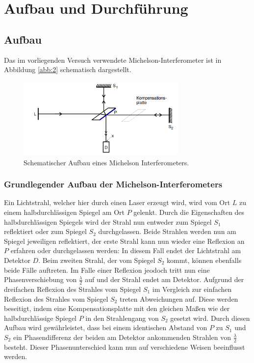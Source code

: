 \section{Aufbau und Durchführung}
\subsection{Aufbau}
\label{sec:Aufbau}

Das im vorliegenden Versuch verwendete Michelson-Interferometer ist in Abbildung \ref{abb:2} schematisch dargestellt.
\begin{figure}[H]
  \centering
  \includegraphics[height=4cm]{ressources/aufbau1.png}
  \caption{Schematischer Aufbau eines Michelson Interferometers. \cite{skript}}
  \label{abb:1}
\end{figure}

\subsubsection{Grundlegender Aufbau der Michelson-Interferometers}
Ein Lichtstrahl, welcher hier durch einen Laser erzeugt wird, wird vom Ort $L$ zu einem halbdurchlässigen Spiegel am Ort $P$ gelenkt.
Durch die Eigenschaften des halbdurchlässigen Spiegels wird der Strahl nun entweder zum Spiegel $S_1$ reflektiert oder zum Spiegel $S_2$ durchgelassen.
Beide Strahlen werden nun am Spiegel jeweiligen reflektiert, der erste Strahl kann nun wieder eine Reflexion an $P$ erfahren oder durchgelassen werden: In diesem Fall endet der Lichtstrahl am Detektor $D$.
Beim zweiten Strahl, der vom Spiegel $S_2$ kommt, können ebenfalls beide Fälle auftreten.
Im Falle einer Reflexion jeodoch tritt nun eine Phasenverschiebung von $\frac{\lambda}{2}$ auf und der Strahl endet am Detektor.
Aufgrund der dreifachen Reflexion des Strahles vom Spiegel $S_1$ im Vergleich zur einfachen Reflexion des Strahles vom Spiegel $S_2$ treten Abweichungen auf.
Diese werden beseitigt, indem eine Kompensationsplatte mit den gleichen Maßen wie der halbdurchlässige Spiegel $P$ in den Strahlengang von $S_2$ gesetzt wird.
Durch diesen Aufbau wird gewährleistet, dass bei einem identischen Abstand von $P$ zu $S_1$ und $S_2$ ein Phasendifferenz der beiden am Detektor ankommenden Strahlen von $\frac{\lambda}{2}$ besteht.
Dieser Phasenunterschied kann nun auf verschiedene Weisen beeinflusst werden.

